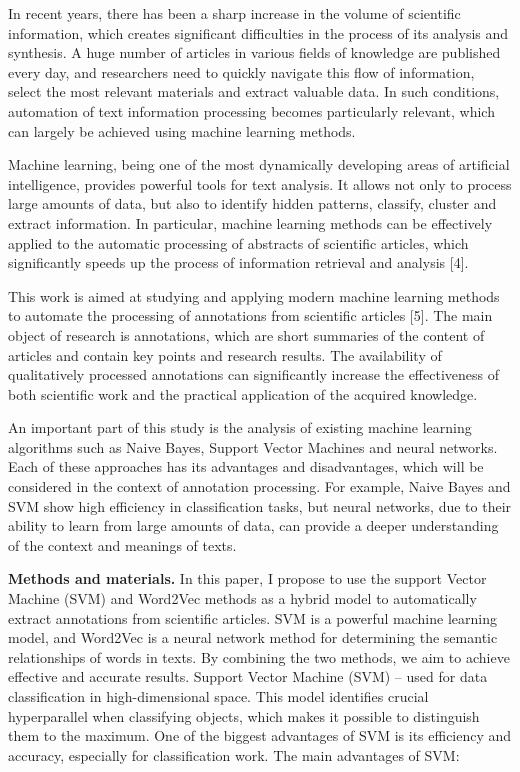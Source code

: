 In recent years, there has been a sharp increase in the volume of
scientific information, which creates significant difficulties in the
process of its analysis and synthesis. A huge number of articles in
various fields of knowledge are published every day, and researchers
need to quickly navigate this flow of information, select the most
relevant materials and extract valuable data. In such conditions,
automation of text information processing becomes particularly relevant,
which can largely be achieved using machine learning methods.

Machine learning, being one of the most dynamically developing areas of
artificial intelligence, provides powerful tools for text analysis. It
allows not only to process large amounts of data, but also to identify
hidden patterns, classify, cluster and extract information. In
particular, machine learning methods can be effectively applied to the
automatic processing of abstracts of scientific articles, which
significantly speeds up the process of information retrieval and
analysis {[}4{]}.

This work is aimed at studying and applying modern machine learning
methods to automate the processing of annotations from scientific
articles {[}5{]}. The main object of research is annotations, which are
short summaries of the content of articles and contain key points and
research results. The availability of qualitatively processed
annotations can significantly increase the effectiveness of both
scientific work and the practical application of the acquired knowledge.

An important part of this study is the analysis of existing machine
learning algorithms such as Naive Bayes, Support Vector Machines and
neural networks. Each of these approaches has its advantages and
disadvantages, which will be considered in the context of annotation
processing. For example, Naive Bayes and SVM show high efficiency in
classification tasks, but neural networks, due to their ability to learn
from large amounts of data, can provide a deeper understanding of the
context and meanings of texts.

{\bfseries Methods and materials.} In this paper, I propose to use the
support Vector Machine (SVM) and Word2Vec methods as a hybrid model to
automatically extract annotations from scientific articles. SVM is a
powerful machine learning model, and Word2Vec is a neural network method
for determining the semantic relationships of words in texts. By
combining the two methods, we aim to achieve effective and accurate
results. Support Vector Machine (SVM) -- used for data classification in
high-dimensional space. This model identifies crucial hyperparallel when
classifying objects, which makes it possible to distinguish them to the
maximum. One of the biggest advantages of SVM is its efficiency and
accuracy, especially for classification work. The main advantages of
SVM:

